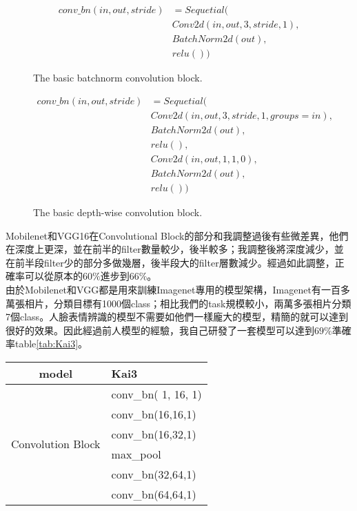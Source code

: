 \documentclass[12pt, a4paper]{article}
\begin{document}
\begin{enumerate}
\begin{figure}[h]
    \begin{align*}
        conv\_bn(in,out,stride) &= Sequetial(\\
        &Conv2d(in, out, 3, stride, 1),\\
        &BatchNorm2d(out),\\
        &relu())
    \end{align*}
    \caption{The basic batchnorm convolution block.}
    \label{fig:conv_bn}
\end{figure}

\begin{figure}[h]
    \begin{align*}
        conv\_bn(in,out,stride) &= Sequetial(\\
        &Conv2d(in, out, 3, stride, 1, groups=in),\\
        &BatchNorm2d(out),\\
        &relu(),\\
        &Conv2d(in, out, 1, 1, 0),\\
        &BatchNorm2d(out),\\
        &relu())
    \end{align*}
    \caption{The basic depth-wise convolution block.}
    \label{fig:conv_dw}
\end{figure}
Mobilenet和VGG16在Convolutional Block的部分和我調整過後有些微差異，他們在深度上更深，並在前半的filter數量較少，後半較多；我調整後將深度減少，並在前半段filter少的部分多做幾層，後半段大的filter層數減少。經過如此調整，正確率可以從原本的$60\%$進步到$66\%$。\\
由於Mobilenet和VGG都是用來訓練Imagenet專用的模型架構，Imagenet有一百多萬張相片，分類目標有1000個class；相比我們的task規模較小，兩萬多張相片分類7個class。人臉表情辨識的模型不需要如他們一樣龐大的模型，精簡的就可以達到很好的效果。因此經過前人模型的經驗，我自己研發了一套模型可以達到$69\%$準確率table\ref{tab:Kai3}。
\begin{table}[h]
\centering
\begin{tabular}{|c|l|}\hline
    model&Kai3\\ \hline
    \multirow{12}{*}{Convolution Block}&conv\_bn(  1,  16, 1)\\
    &conv\_bn(16,16,1)\\
    &conv\_bn(16,32,1)\\
    &max\_pool\\
    &conv\_bn(32,64,1)\\
    &conv\_bn(64,64,1)\\

\end{tabular}
\end{table}
\end{enumerate}
\end{document}
